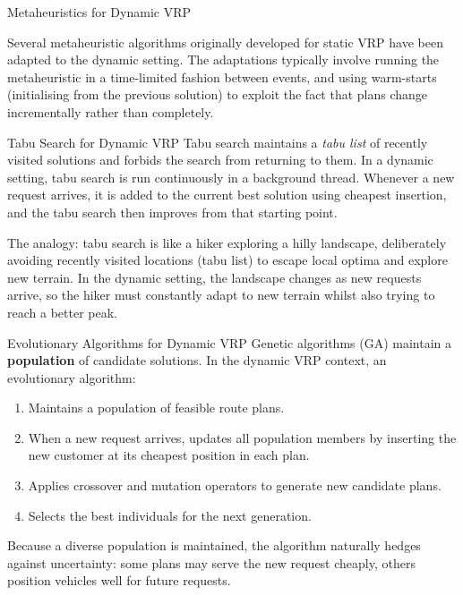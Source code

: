 \documentclass[aspectratio=169,10pt]{beamer}
\begin{document}
\begin{frame}[allowframebreaks]{Metaheuristics for Dynamic VRP}

  Several metaheuristic algorithms originally developed for static VRP have
  been adapted to the dynamic setting.  The adaptations typically involve
  running the metaheuristic in a time-limited fashion between events, and
  using warm-starts (initialising from the previous solution) to exploit
  the fact that plans change incrementally rather than completely.

  \begin{block}{Tabu Search for Dynamic VRP}
    Tabu search maintains a \emph{tabu list} of recently visited solutions and
    forbids the search from returning to them.  In a dynamic setting, tabu
    search is run continuously in a background thread.  Whenever a new request
    arrives, it is added to the current best solution using cheapest insertion,
    and the tabu search then improves from that starting point.

    The analogy: tabu search is like a hiker exploring a hilly landscape,
    deliberately avoiding recently visited locations (tabu list) to escape
    local optima and explore new terrain.  In the dynamic setting, the
    landscape changes as new requests arrive, so the hiker must constantly
    adapt to new terrain whilst also trying to reach a better peak.
  \end{block}

  \begin{block}{Evolutionary Algorithms for Dynamic VRP}
    Genetic algorithms (GA) maintain a \textbf{population} of candidate solutions.
    In the dynamic VRP context, an evolutionary algorithm:
    \begin{enumerate}
      \item Maintains a population of feasible route plans.
      \item When a new request arrives, updates all population members by
            inserting the new customer at its cheapest position in each plan.
      \item Applies crossover and mutation operators to generate new candidate
            plans.
      \item Selects the best individuals for the next generation.
    \end{enumerate}
    Because a diverse population is maintained, the algorithm naturally hedges
    against uncertainty: some plans may serve the new request cheaply, others
    position vehicles well for future requests.
  \end{block}


\end{frame}
\end{document}
